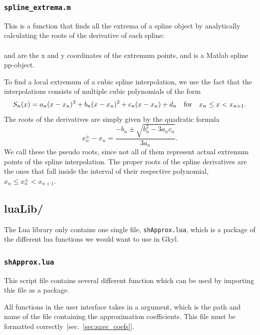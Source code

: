 \documentclass[11pt,a4paper, 
swedish, english %
]{article}
\begin{document}
\subsubsection{\texttt{spline\_extrema.m}}\label{sec:spline_extrema}
This is a function that finds all the extrema of a spline object by
analytically calculating the roots of the derivative of each spline:\\
\indent{}\\
 and  are the x and y coordinates of the extremum
points, and  is a Matlab spline pp-object.

To find a local extremum of a cubic spline interpolation, we use the
fact that the interpolations consists of multiple cubic polynomials of
the form 
\begin{equation}
S_n(x) = a_n(x-x_{n})^3+b_n(x-x_n)^2+c_n(x-x_n)+d_n
\qfor x_n\le x<x_{n+1}.
\end{equation}
The roots of the derivatives are simply given by the quadratic formula
\begin{equation}
x^{\pm}_n-x_n=\frac{-b_n\pm\sqrt{b_n^2-3a_nc_n}}{3a_n}.
\end{equation}
We call these the pseudo roots, since not all of them represent actual
extremum points of the spline interpolation. The proper roots of the
spline derivatives are the ones that fall inside the interval of their
respective polynomial, $x_n\le x_n^\pm<x_{n+1}$.  



\subsection{luaLib/}
The Lua library only contains one single file, \texttt{shApprox.lua},
which is a package of the different lua functions we would want to use
in Gkyl.

\subsubsection{\texttt{shApprox.lua}}
\label{sec:shApprox}
This script file contains several different function which can be used
by importing this file as a package.

All functions in the user interface takes in a 
argument, which is the path and name of the file containing the
approximation coefficients. This file must be formatted
correctly~[sec.~\ref{sec:save_coefs}].
\end{document}
